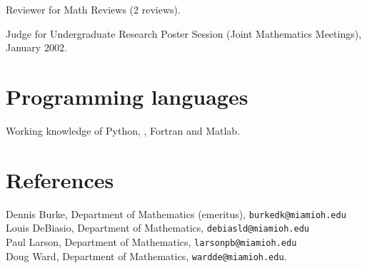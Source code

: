 \documentclass[overlapped,line,letterpaper]{res}
\begin{document}
\begin{resume}
Reviewer for Math Reviews (2 reviews).

Judge for Undergraduate Research Poster Session (Joint Mathematics Meetings), January 2002.   


\large
\section{\bf Programming languages}
\vspace{3mm}
\normalsize

Working knowledge of Python, \Cplusplus, Fortran and Matlab.



\large
\section{\bf References}
\vspace{3mm}
\normalsize


Dennis Burke, Department of Mathematics (emeritus), \texttt{burkedk@miamioh.edu} \\
Louis DeBiasio, Department of Mathematics, \texttt{debiasld@miamioh.edu} \\
Paul Larson, Department of Mathematics, \texttt{larsonpb@miamioh.edu} \\
Doug Ward, Department of Mathematics, \texttt{wardde@miamioh.edu}.













\end{resume}
\end{document}
